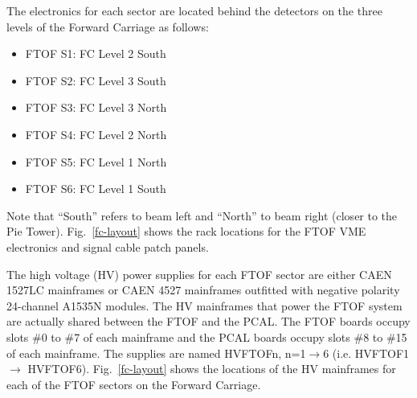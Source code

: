 \documentclass[12pt]{article}
\begin{document}
The electronics for each sector are located behind the detectors on the three levels of the
Forward Carriage as follows:

\vskip 0.5cm

\begin{minipage}{0.5\textwidth}
\begin{itemize}
\item FTOF S1: FC Level 2 South
\item FTOF S2: FC Level 3 South
\item FTOF S3: FC Level 3 North
\end{itemize}
\end{minipage}
\begin{minipage}{0.5\textwidth}
\begin{itemize}
\item FTOF S4: FC Level 2 North
\item FTOF S5: FC Level 1 North
\item FTOF S6: FC Level 1 South
\end{itemize}
\end{minipage}

\vskip 0.5cm

Note that ``South'' refers to beam left and ``North'' to beam right (closer to the Pie 
Tower). Fig.~\ref{fc-layout} shows the rack locations for the FTOF VME electronics and 
signal cable patch panels. 

The high voltage (HV) power supplies for each FTOF sector are either CAEN 1527LC 
mainframes or CAEN 4527 mainframes outfitted with negative polarity 24-channel A1535N 
modules. The HV mainframes that power the FTOF system are actually shared between the 
FTOF and the PCAL. The FTOF boards occupy slots \#0 to \#7 of each mainframe and the 
PCAL boards occupy slots \#8 to \#15 of each mainframe. The supplies are named HVFTOFn, 
n=1$\to$6 (i.e. HVFTOF1 $\to$ HVFTOF6). Fig.~\ref{fc-layout} shows the locations of the 
HV mainframes for each of the FTOF sectors on the Forward Carriage.
\end{document}
